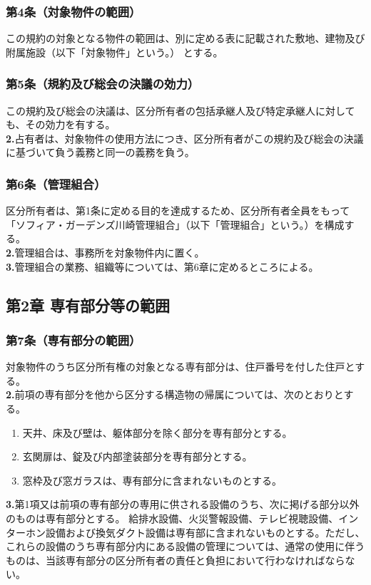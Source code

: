 \documentclass[12pt,uplatex]{jsarticle}
\begin{document}
\subsubsection*{ 第4条（対象物件の範囲）}
この規約の対象となる物件の範囲は、別に定める表に記載された敷地、建物及び附属施設（以下「対象物件」という。）
とする。
\subsubsection*{ 第5条（規約及び総会の決議の効力）}
この規約及び総会の決議は、区分所有者の包括承継人及び特定承継人に対しても、その効力を有する。\\
\textbf{2.}占有者は、対象物件の使用方法につき、区分所有者がこの規約及び総会の決議に基づいて負う義務と同一の義務を負う。
\subsubsection*{ 第6条（管理組合）}
区分所有者は、第1条に定める目的を達成するため、区分所有者全員をもって「ソフィア・ガーデンズ川崎管理組合」（以下「管理組合」という。）を構成する。\\
\textbf{2.}管理組合は、事務所を対象物件内に置く。\\
\textbf{3.}管理組合の業務、組織等については、第6章に定めるところによる。\\

\begin{center}
\subsection*{第2章 専有部分等の範囲}
\end{center}
\subsubsection*{ 第7条（専有部分の範囲）}
対象物件のうち区分所有権の対象となる専有部分は、住戸番号を付した住戸とする。\\
\textbf{2.}前項の専有部分を他から区分する構造物の帰属については、次のとおりとする。
\begin{enumerate}
\item 天井、床及び壁は、躯体部分を除く部分を専有部分とする。
\item 玄関扉は、錠及び内部塗装部分を専有部分とする。
\item 窓枠及び窓ガラスは、専有部分に含まれないものとする。 
\end{enumerate}
\textbf{3.}第1項又は前項の専有部分の専用に供される設備のうち、次に掲げる部分以外のものは専有部分とする。
給排水設備、火災警報設備、テレビ視聴設備、インターホン設備および換気ダクト設備は専有部に含まれないものとする。ただし、これらの設備のうち専有部分内にある設備の管理については、通常の使用に伴うものは、当該専有部分の区分所有者の責任と負担において行わなければならない。
\end{document}
